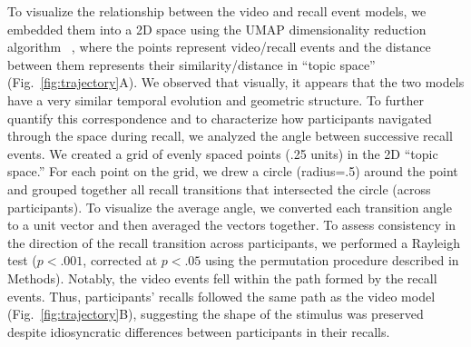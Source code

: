 \documentclass{article}
\begin{document}
To visualize the relationship between the video and recall event models, we embedded them into a 2D space using the UMAP dimensionality reduction algorithm ~\citep{McInHeal18}, where the points represent video/recall events and the distance between them represents their similarity/distance in ``topic space'' (Fig.~\ref{fig:trajectory}A).  We observed that visually, it appears that the two models have a very similar temporal evolution and geometric structure. To further quantify this correspondence and to characterize how participants navigated through the space during recall, we analyzed the angle between successive recall events. We created a grid of evenly spaced points (.25 units) in the 2D ``topic space.'' For each point on the grid, we drew a circle (radius=.5) around the point and grouped together all recall transitions that intersected the circle (across participants). To visualize the average angle, we converted each transition angle to a unit vector and then averaged the vectors together. To assess consistency in the direction of the recall transition across participants, we performed a Rayleigh test ($p<.001$, corrected at $p<.05$ using the permutation procedure described in Methods). Notably, the video events fell within the path formed by the recall events.  Thus, participants' recalls followed the same path as the video model (Fig.~\ref{fig:trajectory}B), suggesting the shape of the stimulus was preserved despite idiosyncratic differences between participants in their recalls.

\end{document}
